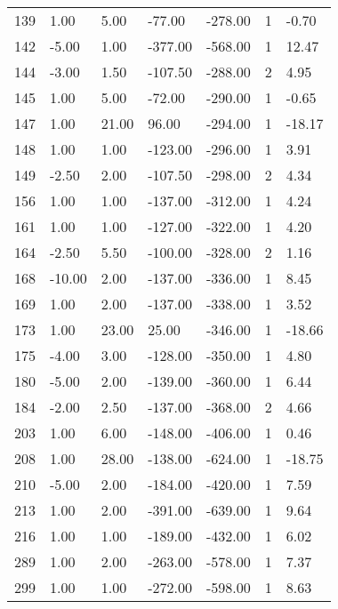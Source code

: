 \begin{appendices}
\begin{longtable}[c]{@{}lllllll@{}}
\rowcolor[HTML]{FFCCC9}
139 & 1.00 & 5.00 & -77.00 & -278.00 & 1 & -0.70 \\
\rowcolor[HTML]{FFCCC9}
142 & -5.00 & 1.00 & -377.00 & -568.00 & 1 & 12.47 \\
\rowcolor[HTML]{FFCCC9}
144 & -3.00 & 1.50 & -107.50 & -288.00 & 2 & 4.95 \\
\rowcolor[HTML]{FFCCC9}
145 & 1.00 & 5.00 & -72.00 & -290.00 & 1 & -0.65 \\
\rowcolor[HTML]{FFCCC9}
147 & 1.00 & 21.00 & 96.00 & -294.00 & 1 & -18.17 \\
\rowcolor[HTML]{FFCCC9}
148 & 1.00 & 1.00 & -123.00 & -296.00 & 1 & 3.91 \\
\rowcolor[HTML]{FFCCC9}
149 & -2.50 & 2.00 & -107.50 & -298.00 & 2 & 4.34 \\
\rowcolor[HTML]{FFCCC9}
156 & 1.00 & 1.00 & -137.00 & -312.00 & 1 & 4.24 \\
\rowcolor[HTML]{FFCCC9}
161 & 1.00 & 1.00 & -127.00 & -322.00 & 1 & 4.20 \\
\rowcolor[HTML]{FFCCC9}
164 & -2.50 & 5.50 & -100.00 & -328.00 & 2 & 1.16 \\
\rowcolor[HTML]{FFCCC9}
168 & -10.00 & 2.00 & -137.00 & -336.00 & 1 & 8.45 \\
\rowcolor[HTML]{FFCCC9}
169 & 1.00 & 2.00 & -137.00 & -338.00 & 1 & 3.52 \\
\rowcolor[HTML]{FFCCC9}
173 & 1.00 & 23.00 & 25.00 & -346.00 & 1 & -18.66 \\
\rowcolor[HTML]{FFCCC9}
175 & -4.00 & 3.00 & -128.00 & -350.00 & 1 & 4.80 \\
\rowcolor[HTML]{FFCCC9}
180 & -5.00 & 2.00 & -139.00 & -360.00 & 1 & 6.44 \\
\rowcolor[HTML]{FFCCC9}
184 & -2.00 & 2.50 & -137.00 & -368.00 & 2 & 4.66 \\
\rowcolor[HTML]{FFCCC9}
203 & 1.00 & 6.00 & -148.00 & -406.00 & 1 & 0.46 \\
\rowcolor[HTML]{FFCCC9}
208 & 1.00 & 28.00 & -138.00 & -624.00 & 1 & -18.75 \\
\rowcolor[HTML]{FFCCC9}
210 & -5.00 & 2.00 & -184.00 & -420.00 & 1 & 7.59 \\
\rowcolor[HTML]{FFCCC9}
213 & 1.00 & 2.00 & -391.00 & -639.00 & 1 & 9.64 \\
\rowcolor[HTML]{FFCCC9}
216 & 1.00 & 1.00 & -189.00 & -432.00 & 1 & 6.02 \\
\rowcolor[HTML]{FFCCC9}
289 & 1.00 & 2.00 & -263.00 & -578.00 & 1 & 7.37 \\
\rowcolor[HTML]{FFCCC9}
299 & 1.00 & 1.00 & -272.00 & -598.00 & 1 & 8.63 \\

\end{longtable}
\end{appendices}
